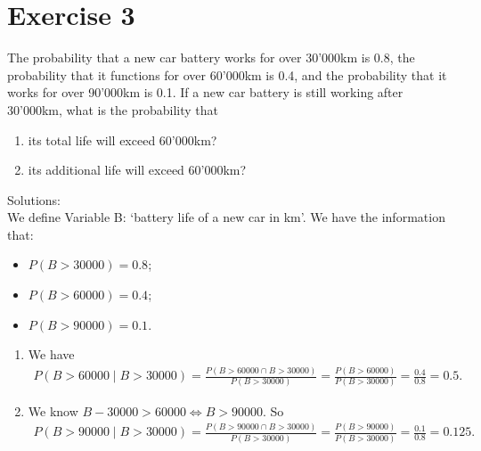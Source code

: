 \documentclass[12pt,thmsa]{article}
\begin{document}
\section*{Exercise 3}

The probability that a new car battery works for over  30'000km is
0.8, the probability that it functions for over 60'000km is 0.4, and the probability that it
works for over 90'000km is 0.1. If a new car battery is still working after 30'000km,
what is the probability that

\begin{enumerate}
\item  its total life will exceed 60'000km?
\item its additional life will exceed 60'000km?

\end{enumerate} 

\noindent Solutions:\\
We define Variable B: `battery life of a new car in km'. We have the information that:
\begin{itemize}
\item $P(B> 30000) =0.8$;
\item $P(B>60000) = 0.4$;
\item $P(B>90000)=0.1$.
\end{itemize}

\begin{enumerate}
\item We have \begin{align*}
P(B > 60000 \mid B > 30000) = \frac{ P(B > 60000 \cap B> 30000) }{ P(B > 30000) }= \frac{P(B>60000) }{P(B > 30000)}= \frac{0.4}{0.8}= 0.5.
\end{align*}

\item 
\noindent We know $B - 30000 > 60000 \Leftrightarrow B>90000$. So
\begin{align*}
P( B > 90000 \mid B>30000 ) =  \frac{ P(B > 90000 \cap B> 30000) }{ P(B > 30000) }= \frac{P(B>90000) }{P(B > 30000)}= \frac{0.1}{0.8}= 0.125.
\end{align*}
\end{enumerate}

 
\end{document}
